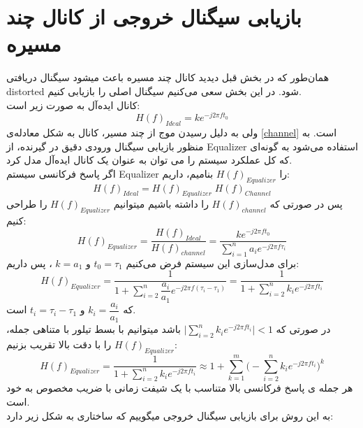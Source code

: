 \documentclass[a4paper]{article}
\begin{document}
\section{
بازیابی سیگنال خروجی از کانال چند مسیره
}
همان‌طور که در بخش قبل دیدید کانال چند مسیره باعث میشود سیگنال دریافتی  distorted شود. در این بخش سعی می‌کنیم سیگنال اصلی را بازیابی کنیم.
\\
کانال ایده‌آل به صورت زیر است:
\begin{equation}
	 H(f)_{Ideal} = k e^{-j2 \pi f t_{0}} 
\end{equation}
ولی به دلیل رسیدن موج از چند مسیر، کانال به شکل معادله‌ی 
 \ref{channel}
است. به منظور بازیابی سیگنال ورودی دقیق در گیرنده‌، از Equalizer استفاده می‌شود به گونه‌ای که کل عملکرد سیستم را می توان به عنوان یک کانال ایده‌آل مدل کرد.
\\
اگر پاسخ فرکانسی سیستم‌ Equalizer را $ H(f)_{Equalizer}  $ بنامیم، داریم:
\begin{equation}
	H(f)_{Ideal} = H(f)_{Equalizer} \; H(f)_{Channel} 
\end{equation}
پس در صورتی که $  H(f)_{channel}  $ را داشته باشیم میتوانیم $ H(f)_{Equalizer}  $  را طراحی کنیم:
\begin{equation}
	H(f)_{Equalizer} = \dfrac{H(f)_{Ideal}}{ H(f)_{channel} } = \frac{k e^{-j2 \pi f t_{0}}}{\sum_{i=1}^{n} a_{i} e^{-j2 \pi f \tau_{i}}}
\end{equation}
برای مدل‌سازی این سیستم فرض می‌کنیم $ t_{0} = \tau_{1} $ و $ k = a_{1} $ ، پس داریم: 
\begin{equation}
	H(f)_{Equalizer} = \frac{1}{1+\sum_{i=2}^{n} \dfrac{a_{i}}{a_{1}} e^{-j2 \pi f (\tau_{i}-\tau_{1})}} = \frac{1}{1+\sum_{i=2}^{n} k_{i} e^{-j2 \pi f t_{i}}}
\end{equation}
که
  $ k_{i} = \dfrac{a_{i}}{a_{1}} $
  و 
  $ t_{i} = \tau_{i}-\tau_{1} $
  است. 
  \\
  در صورتی که 
  $ \lvert \sum_{i=2}^{n} k_{i} e^{-j2 \pi f t_{i}} \rvert < 1 $
  باشد میتوانیم با بسط تیلور با متناهی جمله، $ H(f)_{Equalizer} $ را با دقت بالا تقریب بزنیم:
\begin{equation}
  	H(f)_{Equalizer} = \frac{1}{1+\sum_{i=2}^{n} k_{i} e^{-j2 \pi f t_{i}}}  \approx 1 + \sum_{k=1}^{m} \big(-\sum_{i=2}^{n} k_{i} e^{-j2 \pi f t_{i}}\big)^{k}
  	\label{Equalizer}
\end{equation}
هر جمله ی پاسخ فرکانسی بالا متناسب با یک شیفت زمانی با ضریب مخصوص به خود است.
 \\
 به این روش برای بازیابی سیگنال خروجی  
\textbf{ }
 میگوییم که ساختاری به شکل زیر دارد:
 
\end{document}
